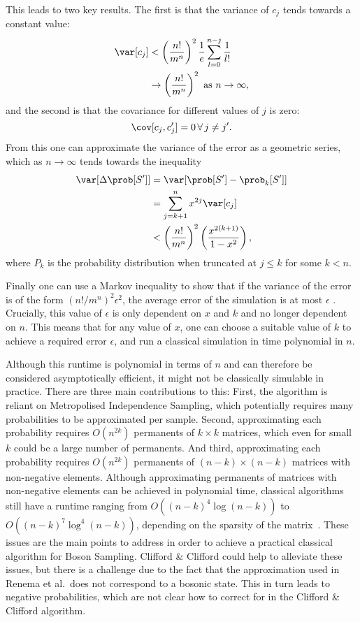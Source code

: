 This leads to two key results. The first is that the variance of $c_j$ tends towards a constant value:
\begin{align}
\var[c_j] &< \left(\frac{n!}{m^n}\right)^2\frac{1}{e}\sum_{l=0}^{n-j}\frac{1}{l!} \label{eqn:var}\\
&\rightarrow\left(\frac{n!}{m^n}\right)^2 \textrm{ as } n\rightarrow\infty,
\end{align}
and the second is that the covariance for different values of $j$ is zero:
\begin{equation}
\cov[c_j,c_j'] = 0\, \forall\, j\neq j'\label{eqn:covar}.
\end{equation}
From this one can approximate the variance of the error as a geometric series, which as $n\rightarrow\infty$ tends towards the inequality
\begin{align}
\var[\Delta \prob[S']] &= \var[\prob[S']-\prob_k[S']]\\
&= \sum_{j=k+1}^nx^{2j}\var[c_j]\label{eqn:renema-variance}\\
&< \left(\frac{n!}{m^n}\right)^2\left(\frac{x^{2(k+1)}}{1-x^2}\right),
\end{align}
\noindent where $P_k$ is the probability distribution when truncated at $j\leq k$ for some $k<n$.

Finally one can use a Markov inequality to show that if the variance of the error is of the form $(n!/m^n)^2\epsilon^2$, the average error of the simulation is at most $\epsilon$ \cite{renema2018loss}.
Crucially, this value of $\epsilon$ is only dependent on $x$ and $k$ and no longer dependent on $n$.
This means that for any value of $x$, one can choose a suitable value of $k$ to achieve a required error $\epsilon$, and run a classical simulation in time polynomial in $n$.

Although this runtime is polynomial in terms of $n$ and can therefore be considered asymptotically efficient, it might not be classically simulable in practice. 
There are three main contributions to this: 
First, the algorithm is reliant on Metropolised Independence Sampling, which potentially requires many probabilities to be approximated per sample. 
Second, approximating each probability requires $O(n^{2k})$ permanents of $k\times k$ matrices, which even for small $k$ could be a large number of permanents. 
And third, approximating each probability requires $O(n^{2k})$ permanents of $(n-k)\times(n-k)$ matrices with non-negative elements. 
Although approximating permanents of matrices with non-negative elements can be achieved in polynomial time, classical algorithms still have a runtime ranging from $O((n-k)^4\log(n-k))$ to $O((n-k)^{7}\log^4(n-k))$, depending on the sparsity of the matrix~\cite{huber2008}. These issues are the main points to address in order to achieve a practical classical algorithm for Boson Sampling. Clifford \& Clifford could help to alleviate these issues, but there is a challenge due to the fact that the approximation used in Renema et al.\ does not correspond to a bosonic state. 
This in turn leads to negative probabilities, which are not clear how to correct for in the Clifford \& Clifford algorithm.

